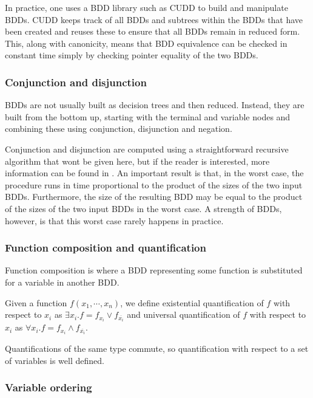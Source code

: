 In practice, one uses a BDD library such as CUDD \cite{cudd} to build and manipulate BDDs. CUDD keeps track of all BDDs and subtrees within the BDDs that have been created and reuses these to ensure that all BDDs remain in reduced form. This, along with canonicity, means that BDD equivalence can be checked in constant time simply by checking pointer equality of the two BDDs.

\subsubsection{Conjunction and disjunction}

BDDs are not usually built as decision trees and then reduced. Instead, they are built from the bottom up, starting with the terminal and variable nodes and combining these using conjunction, disjunction and negation.

Conjunction and disjunction are computed using a straightforward recursive algorithm that wont be given here, but if the reader is interested, more information can be found in \cite{somenzi_bdd}. An important result is that, in the worst case, the procedure runs in time proportional to the product of the sizes of the two input BDDs. Furthermore, the size of the resulting BDD may be equal to the product of the sizes of the two input BDDs in the worst case. A strength of BDDs, however, is that this worst case rarely happens in practice. 

\subsubsection{Function composition and quantification}

Function composition is where a BDD representing some function is substituted for a variable in another BDD.

Given a function $f(x_1,\cdots,x_n)$, we define existential quantification of $f$ with respect to $x_i$ as $\exists x_i. f = f_{x_i} \vee f_{\overline{x_i}}$ and universal quantification of $f$ with respect to $x_i$ as $\forall x_i. f = f_{x_i} \wedge f_{\overline{x_i}}$.

Quantifications of the same type commute, so quantification with respect to a set of variables is well defined. 

\subsubsection{Variable ordering}

